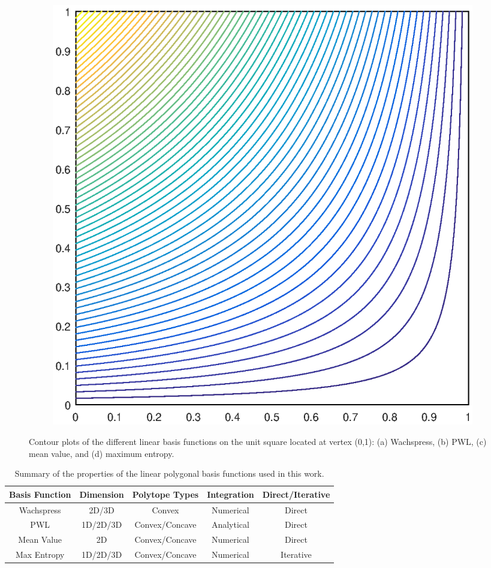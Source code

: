\documentclass[11pt]{article}
\begin{document}
\begin{figure}
\begin{subfigure}[b]{0.225\textwidth}
		\caption{}
	\end{subfigure}
	\hspace{1cm}
	\begin{subfigure}[b]{0.225\textwidth}
		\centering
		\includegraphics[width=\textwidth]{figures/square_MAXENT1_contour_b4.eps}
		\caption{}
	\end{subfigure}
\caption{Contour plots of the different linear basis functions on the unit square located at vertex (0,1): (a) Wachspress, (b) PWL, (c) mean value, and (d) maximum entropy.}
\end{figure}

\begin{table}[hbt]
\label{tab::lin_poly_summary}
\caption{Summary of the properties of the linear polygonal basis functions used in this work.}
\centering
\begin{tabular}{|c|c|c|c|c|}
\hline
Basis Function & Dimension & Polytope Types & Integration & Direct/Iterative \\
\hline \hline
Wachspress	&2D/3D&	Convex&	Numerical	&Direct\\ \hline
PWL&	1D/2D/3D&	Convex/Concave&	Analytical	&Direct\\ \hline
Mean Value&	2D&	Convex/Concave&	Numerical	&Direct\\ \hline
Max Entropy&	1D/2D/3D	&Convex/Concave&	Numerical&	Iterative\\ \hline
\end{tabular}
\end{table}
\end{document}
